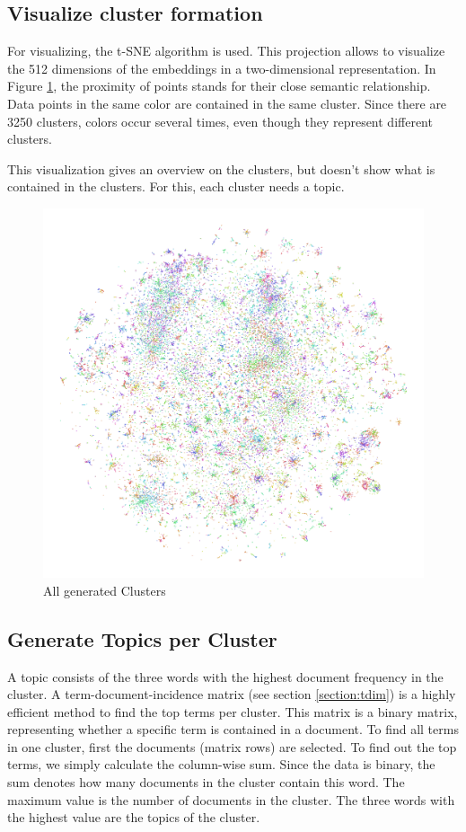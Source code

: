 \subsection{Visualize cluster formation}
For visualizing, the \ac{t-SNE} algorithm is used. This projection allows to visualize the 512 dimensions of the embeddings in a two-dimensional representation. In Figure \ref{fig:kmeans}, the proximity of points stands for their close semantic relationship. Data points in the same color are contained in the same cluster. Since there are 3250 clusters, colors occur several times, even though they represent different clusters.

This visualization gives an overview on the clusters, but doesn't show what is contained in the clusters. For this, each cluster needs a topic.

\begin{figure}[!h]
	\centering
	\includegraphics[width=\linewidth]{Bilder/models/minibatchkmeans.pdf}
	\caption{All generated Clusters}
	\label{fig:kmeans}
\end{figure}


\newpage
\subsection{Generate Topics per Cluster}
\label{section:topics}
A topic consists of the three words with the highest document frequency in the cluster. A term-document-incidence matrix (see section \ref{section:tdim}) is a highly efficient method to find the top terms per cluster. This matrix is a binary matrix, representing whether a specific term is contained in a document. To find all terms in one cluster, first the documents (matrix rows) are selected. To find out the top terms, we simply calculate the column-wise sum. Since the data is binary, the sum denotes how many documents in the cluster contain this word. The maximum value is the number of documents in the cluster. The three words with the highest value are the topics of the cluster.

